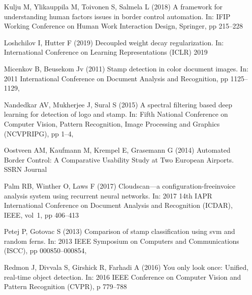 \documentclass[twocolumn]{svjour3}
\begin{document}
\begin{thebibliography}{43}
	Kulju M, Ylikauppila M, Toivonen S, Salmela L (2018) A framework for
	understanding human factors issues in border control automation. In: IFIP
	Working Conference on Human Work Interaction Design, Springer, pp 215--228
	
	Loshchilov I, Hutter F (2019) Decoupled weight decay regularization. In:
	International Conference on Learning Representations (ICLR) 2019
	
	Micenkov B, Beusekom Jv (2011) Stamp detection in color document images. In:
	2011 International Conference on Document Analysis and Recognition, pp
	1125--1129, 
	
	Nandedkar AV, Mukherjee J, Sural S (2015) A spectral filtering based deep
	learning for detection of logo and stamp. In: Fifth National Conference on
	Computer Vision, Pattern Recognition, Image Processing and Graphics
	(NCVPRIPG), pp 1--4, 
	
	Oostveen AM, Kaufmann M, Krempel E, Grasemann G (2014) Automated {Border}
	{Control}: {A} {Comparative} {Usability} {Study} at {Two} {European}
	{Airports}. SSRN Journal 
	
	Palm RB, Winther O, Laws F (2017) Cloudscan---a configuration-freeinvoice
	analysis system using recurrent neural networks. In: 2017 14th IAPR
	International Conference on Document Analysis and Recognition (ICDAR), IEEE,
	vol~1, pp 406--413
	
	Petej P, Gotovac S (2013) Comparison of stamp classification using svm and
	random ferns. In: 2013 IEEE Symposium on Computers and Communications (ISCC),
	pp 000850--000854, 
	
	Redmon J, Divvala S, Girshick R, Farhadi A (2016) You only look once:
	{U}nified, real-time object detection. In: 2016 IEEE Conference on Computer
	Vision and Pattern Recognition (CVPR), p 779–788
	

\end{thebibliography}
\end{document}

